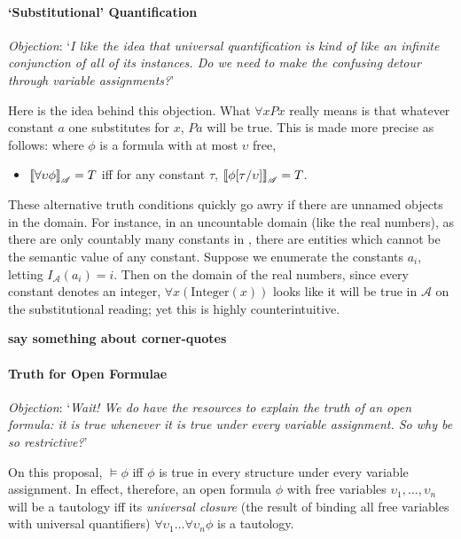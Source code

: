 \paragraph{`Substitutional' Quantification}

\emph{Objection}: `\emph{I like the idea that universal quantification is kind of like an infinite conjunction of all of its instances. Do we need to make the confusing detour through variable assignments?}'

Here is the idea behind this objection. What $\forall x Px$ really means is that whatever constant $a$ one substitutes for $x$, $Pa$ will be true. This is made more precise as follows: where $\phi$ is a formula with at most $\upsilon$ free, \begin{itemize}
	\item $\left\llbracket \forall \upsilon \phi\right\rrbracket_{\mathscr{A}}=T$ iff for any constant $\tau$, $\left\llbracket \phi[\tau/\upsilon]\right\rrbracket_{\mathscr{A}}=T$.
\end{itemize}
These alternative truth conditions quickly go awry if there are unnamed objects in the domain. For instance, in an uncountable domain (like the real numbers), as there are only countably many constants in \ltwo, there are entities which cannot be the semantic value of any constant. Suppose we enumerate the constants $a_{i}$, letting $I_{\mathscr{A}}(a_{i})=i$. Then on the domain of the real numbers, since every constant denotes an integer, $\forall x (\text{Integer}(x))$ looks like it will be true in $\mathscr{A}$ on the substitutional reading; yet this is highly counterintuitive.

\textbf{say something about corner-quotes}

\paragraph{Truth for Open Formulae}

\emph{Objection}: `\emph{Wait! We do have the resources to explain the truth of an open formula: it is true whenever it is true under every variable assignment. So why be so restrictive?}'

On this proposal, $\vDash \phi$ iff $\phi$ is true in every structure under every variable assignment. In effect, therefore, an open formula $\phi$ with free variables $\upsilon_{1},\ldots,\upsilon_{n}$ will be a tautology iff its \emph{universal closure} (the result of binding all free variables with universal quantifiers) $\forall\upsilon_{1}\ldots\forall\upsilon_{n}\phi$ is a tautology.

